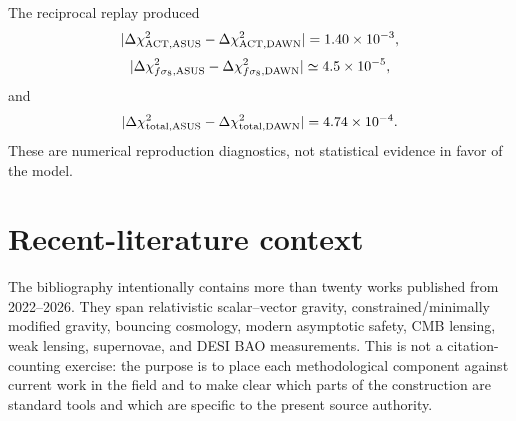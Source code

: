 \documentclass[12pt]{iopart}
\begin{document}
The reciprocal replay produced
\begin{equation}
|\Delta\chi^2_{\rm ACT,ASUS}-\Delta\chi^2_{\rm ACT,DAWN}|=1.40\times10^{-3},
\end{equation}
\begin{equation}
|\Delta\chi^2_{f\sigma_8,{\rm ASUS}}-\Delta\chi^2_{f\sigma_8,{\rm DAWN}}|\simeq4.5\times10^{-5},
\end{equation}
and
\begin{equation}
|\Delta\chi^2_{\rm total,ASUS}-\Delta\chi^2_{\rm total,DAWN}|=4.74\times10^{-4}.
\end{equation}
These are numerical reproduction diagnostics, not statistical evidence in favor of the model.

\section{Recent-literature context}
\label{app:recent}

The bibliography intentionally contains more than twenty works published from 2022--2026.  They span relativistic scalar--vector gravity, constrained/minimally modified gravity, bouncing cosmology, modern asymptotic safety, CMB lensing, weak lensing, supernovae, and DESI BAO measurements.  This is not a citation-counting exercise: the purpose is to place each methodological component against current work in the field and to make clear which parts of the construction are standard tools and which are specific to the present source authority.



\end{document}
